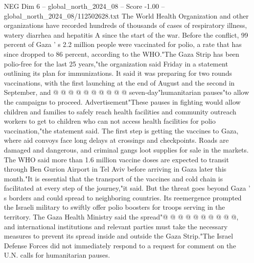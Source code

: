 \begin{textsample}{NEG Dim 6 – global\_north\_2024\_08 – Score -1.00 – global\_north\_2024\_08/112502628.txt}
The World Health Organization and other organizations have recorded hundreds of thousands of cases of respiratory illness, watery diarrhea and hepatitis A since the start of the war.
Before the conflict, 99 percent of Gaza ' s 2.2 million people were vaccinated for polio, a rate that has since dropped to 86 percent, according to the WHO."The Gaza Strip has been polio-free for the last 25 years,"the organization said Friday in a statement outlining its plan for immunizations.
It said it was preparing for two rounds vaccinations, with the first launching at the end of August and the second in September, and @ @ @ @ @ @ @ @ @ @ seven-day"humanitarian pauses"to allow the campaigns to proceed.
Advertisement"These pauses in fighting would allow children and families to safely reach health facilities and community outreach workers to get to children who can not access health facilities for polio vaccination,"the statement said.
The first step is getting the vaccines to Gaza, where aid convoys face long delays at crossings and checkpoints.
Roads are damaged and dangerous, and criminal gangs loot supplies for sale in the markets.
The WHO said more than 1.6 million vaccine doses are expected to transit through Ben Gurion Airport in Tel Aviv before arriving in Gaza later this month."It is essential that the transport of the vaccines and cold chain is facilitated at every step of the journey,"it said.
But the threat goes beyond Gaza ' s borders and could spread to neighboring countries.
Its reemergence prompted the Israeli military to swiftly offer polio boosters for troops serving in the territory.
The Gaza Health Ministry said the spread"@ @ @ @ @ @ @ @ @ @, and international institutions and relevant parties must take the necessary measures to prevent its spread inside and outside the Gaza Strip."The Israel Defense Forces did not immediately respond to a request for comment on the U.N. calls for humanitarian pauses.

\end{textsample}
